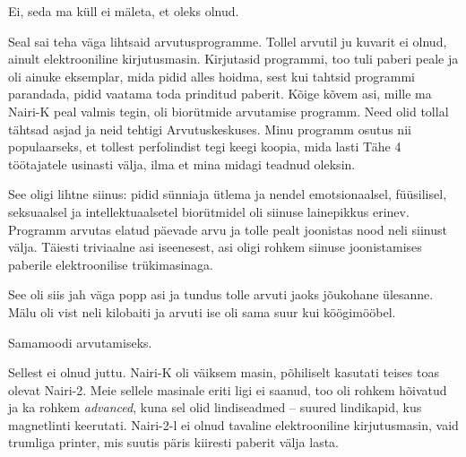 Ei, seda ma küll ei mäleta, et oleks olnud.


Seal sai teha väga lihtsaid arvutusprogramme. Tollel 
arvutil ju kuvarit ei olnud, ainult elektrooniline kirjutusmasin. 
Kirjutasid programmi, too tuli paberi peale ja oli ainuke eksemplar, mida pidid alles hoidma, sest kui tahtsid programmi parandada, pidid vaatama toda prinditud paberit. Kõige kõvem asi, mille ma 
Nairi-K peal valmis tegin, oli biorütmide arvutamise programm. Need olid tollal 
tähtsad asjad ja neid tehtigi Arvutuskeskuses. Minu programm osutus nii
populaarseks, et tollest 
perfolindist tegi keegi koopia, mida lasti Tähe 4 
töötajatele usinasti välja, ilma et mina midagi teadnud oleksin.


See oligi lihtne siinus: pidid sünniaja ütlema ja nendel emotsionaalsel, füüsilisel, seksuaalsel ja intellektuaalsetel biorütmidel oli siinuse 
lainepikkus erinev. Programm arvutas elatud päevade arvu ja tolle pealt 
joonistas nood neli siinust välja. Täiesti 
triviaalne asi iseenesest, asi oligi rohkem siinuse joonistamises paberile elektroonilise trükimasinaga. 


See oli siis jah väga popp asi ja tundus tolle arvuti jaoks 
jõukohane ülesanne. Mälu oli vist neli kilobaiti ja arvuti ise oli sama suur kui köögimööbel.


Samamoodi arvutamiseks.


Sellest ei olnud juttu. Nairi-K oli 
väiksem masin, põhiliselt kasutati teises toas olevat Nairi-2. Meie sellele masinale eriti ligi ei saanud, too 
oli rohkem hõivatud ja ka rohkem \emph{advanced}, kuna sel 
olid lindiseadmed -- suured lindikapid, kus magnetlinti 
keerutati. Nairi-2-l ei olnud tavaline elektrooniline kirjutusmasin, 
vaid trumliga printer, mis suutis päris kiiresti paberit 
välja lasta.

